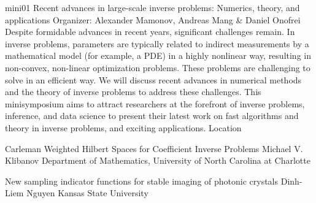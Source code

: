 \mini
{mini01}
{Recent advances in large-scale inverse problems: Numerics, theory, and applications}
{Organizer: Alexander Mamonov, Andreas Mang \& Daniel Onofrei}
{Despite formidable advances in recent years, significant challenges remain. In inverse problems, parameters are typically related to indirect measurements by a mathematical model (for example, a PDE) in a highly nonlinear way, resulting in non-convex, non-linear optimization problems. These problems are challenging to solve in an efficient way. We will discuss recent advances in numerical methods and the theory of inverse problems to address these challenges. This minisymposium aims to attract researchers at the forefront of inverse problems, inference, and data science to present their latest work on fast algorithms and theory in inverse problems, and exciting applications.}
{Location}
\begin{talks}
\item\talk
{Carleman Weighted Hilbert Spaces for Coefficient Inverse Problems}
{Michael V. Klibanov}
{Department of Mathematics, University of North Carolina at Charlotte}
%
%
\item\talk
{New sampling indicator functions for stable imaging of photonic crystals}
{Dinh-Liem Nguyen}
{Kansas State University}

\end{talks}
